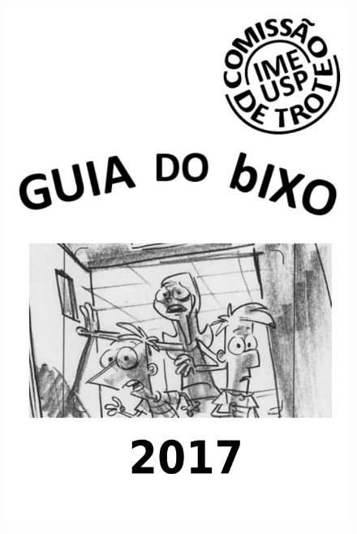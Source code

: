 \documentclass[12pt,twoside]{report}
\begin{document}
\begin{figure}[p]
    \hspace{1.7cm}
    \includegraphics[height=1.05\textheight]{img/capa_2017.pdf} %
\end{figure}
\thispagestyle{empty} %
\clearpage
\newpage



\end{document}
